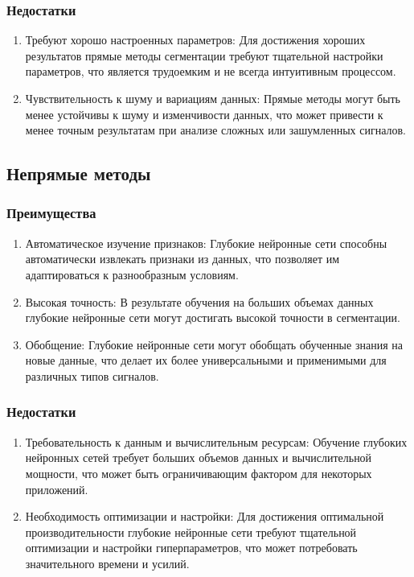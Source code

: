 \subsubsection{Недостатки}

\begin{enumerate}
	\item Требуют хорошо настроенных параметров: Для достижения хороших
	результатов прямые методы сегментации требуют тщательной настройки
	параметров, что является трудоемким и не всегда интуитивным процессом.

	\item Чувствительность к шуму и вариациям данных: Прямые методы могут
	быть менее устойчивы к шуму и изменчивости данных, что может привести к
	менее точным результатам при анализе сложных или зашумленных сигналов.
\end{enumerate}

\subsection{Непрямые методы}
\subsubsection{Преимущества}

\begin{enumerate}
	\item Автоматическое изучение признаков: Глубокие нейронные сети
	способны автоматически извлекать признаки из данных, что позволяет им
	адаптироваться к разнообразным условиям.

	\item Высокая точность: В результате обучения на больших объемах данных
	глубокие нейронные сети могут достигать высокой точности в сегментации.

	\item Обобщение: Глубокие нейронные сети могут обобщать обученные
	знания на новые данные, что делает их более универсальными и
	применимыми для различных типов сигналов.
\end{enumerate}

\subsubsection{Недостатки}

\begin{enumerate}
	\item Требовательность к данным и вычислительным ресурсам: Обучение
	глубоких нейронных сетей требует больших объемов данных и
	вычислительной мощности, что может быть ограничивающим фактором для
	некоторых приложений.

	\item Необходимость оптимизации и настройки: Для достижения оптимальной
	производительности глубокие нейронные сети требуют тщательной
	оптимизации и настройки гиперпараметров, что может потребовать
	значительного времени и усилий.
\end{enumerate}

